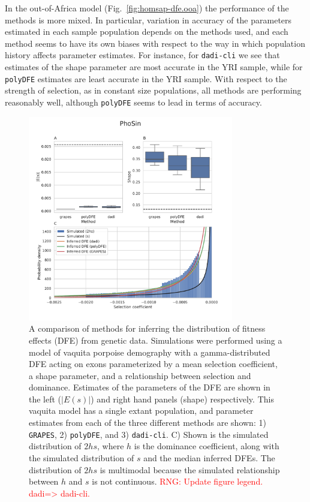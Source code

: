 \documentclass[hidelinks]{article}
\newcommand{\polydfe}{\texttt{polyDFE}\xspace}
\newcommand{\dadicli}{\texttt{dadi-cli}\xspace}
\newcommand{\grapes}{\texttt{GRAPES}\xspace}
\newcommand{\rngcomment}[1]{\textcolor{red}{RNG: #1}}
\begin{document}
    In the out-of-Africa model (Fig.~\ref{fig:homsap-dfe.ooa}) the performance of the methods is more mixed. 
    In particular, variation in accuracy of the parameters estimated in each
    sample population depends on the methods used, and each method seems to 
    have its own biases with respect to the way in which population history 
    affects parameter estimates. For instance, for \dadicli we see that estimates of 
    the shape parameter are most accurate in the YRI sample, while for \polydfe
    estimates are least accurate in the YRI sample. 
    With respect to the strength of selection, as in constant size populations,
    all methods are performing reasonably well, although \polydfe seems to
    lead in terms of accuracy.


    \begin{figure}
        \centering
        \includegraphics[width=0.8\textwidth]{figures/PhoSin/Vaquita2Epoch_1R22/PhoSin_Vaquita2Epoch_1R22_Gamma_R22_Phocoena_sinus.mPhoSin1.pri.110_exons_DFE_plot.pdf}
        \caption{
        \label{fig:vaquita-dfe}
        A comparison of methods for inferring the distribution of fitness effects (DFE) from genetic data.
        Simulations were performed using a model of vaquita porpoise demography \citep{robinson2022critically} with a gamma-distributed DFE
        acting on exons parameterized by a mean selection coefficient, a shape parameter, and a relationship between selection and dominance. Estimates of the 
        parameters of the DFE are shown in the left ($\lvert E(s) \rvert $) and right hand panels (shape) respectively.
        This vaquita model has a single extant population, and parameter estimates from each
        of the three different methods are shown: 1) \grapes \cite{galtier2016adaptive}, 2) \polydfe \citep{tataru2020polydfe},
        and 3) \dadicli \citep{Huang2023,kim2017inference}.
        C) Shown is the simulated distribution of $2 h s$, where $h$ is the dominance coefficient, along with the simulated distribution of $s$ and the median inferred DFEs. The distribution of $2 h s$ is multimodal because the simulated relationship between $h$ and $s$ is not continuous.
            \rngcomment{Update figure legend. dadi=> dadi-cli.}
        }
    \end{figure}
    
\end{document}
